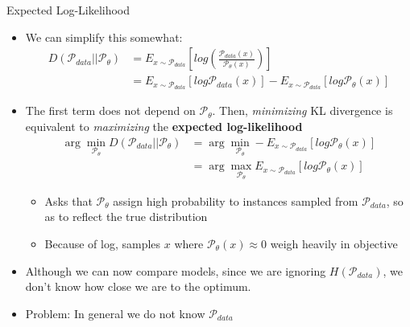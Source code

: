\begin{frame}{Expected Log-Likelihood}

\begin{itemize}
    \item We can simplify this somewhat:
    \begin{equation}
    \begin{split}
        D(\mathcal{P}_{data}||\mathcal{P}_{\theta}) & = E_{x \sim \mathcal{P}_{data}}   \left [log \left ( \frac{\mathcal{P}_{data}(x)}{\mathcal{P}_{\theta}(x)} \right ) \right ] \\
         & = E_{x \sim \mathcal{P}_{data}} [log \mathcal{P}_{data}(x)] - E_{x \sim \mathcal{P}_{data}} [log \mathcal{P}_{\theta}(x)]
    \end{split}
    \end{equation}
    
    \item The first term does not depend on $\mathcal{P}_{\theta}$. Then, \emph{minimizing} KL divergence is equivalent to \emph{maximizing} the \textbf{expected log-likelihood}
    \begin{equation}
    \begin{split}
        \arg\min_{\mathcal{P}_{\theta}} D(\mathcal{P}_{data}||\mathcal{P}_{\theta}) & = \arg\min_{\mathcal{P}_{\theta}} - E_{x \sim \mathcal{P}_{data}} [log \mathcal{P}_{\theta}(x)]\\
        & = \arg\max_{\mathcal{P}_{\theta}} E_{x \sim \mathcal{P}_{data}} [log \mathcal{P}_{\theta}(x)]
    \end{split}
    \end{equation}
    
    \begin{itemize}
        \item Asks that $\mathcal{P}_{\theta}$ assign high probability to instances sampled from $\mathcal{P}_{data}$, so as to reflect the true distribution
        \item Because of log, samples $x$ where $\mathcal{P}_{\theta}(x) \approx 0$ weigh heavily in objective

    \end{itemize}
    \item Although we can now compare models, since we are ignoring $H(\mathcal{P}_{data})$, we don’t know how close we are to the optimum.
    \item Problem: In general we do not know $\mathcal{P}_{data}$

\end{itemize}
\end{frame}

